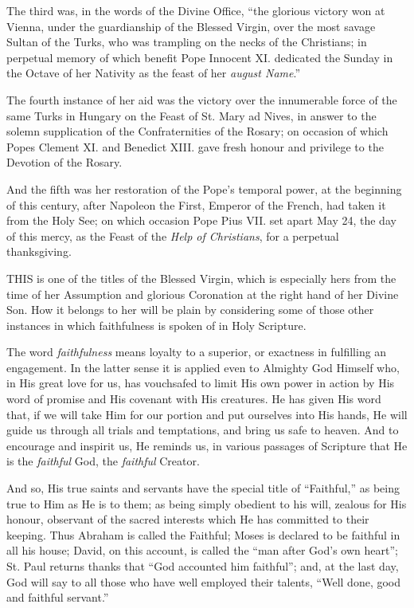 The third was, in the words of
the Divine Office, ``the glorious victory won at Vienna, under the
guardianship of the Blessed Virgin, over the most savage Sultan of the
Turks, who was trampling on the necks of the Christians; in perpetual
memory of which benefit Pope Innocent XI. dedicated the Sunday in the
Octave of her Nativity as the feast of her \emph{august Name}.''

The fourth instance of her aid
was the victory over the innumerable force of the same Turks in Hungary
on the Feast of St. Mary ad Nives, in answer to the solemn supplication
of the Confraternities of the Rosary; on occasion of which Popes Clement
XI. and Benedict XIII. gave fresh honour and privilege to the Devotion
of the Rosary.

And the fifth was her
restoration of the Pope's temporal power, at the beginning of this
century, after Napoleon the First, Emperor of the French, had taken it
from the Holy See; on which occasion Pope Pius VII. set apart May 24,
the day of this mercy, as the Feast of the \emph{Help of Christians},
for a perpetual thanksgiving.



THIS
is one of the titles of the Blessed Virgin, which is especially hers
from the time of her Assumption and glorious Coronation at the right
hand of her Divine Son. How it belongs to her will be plain by
considering some of those other instances in which faithfulness is
spoken of in Holy Scripture.

The word \emph{faithfulness}
means loyalty to a superior, or exactness in fulfilling an engagement.
In the latter sense it is applied even to Almighty God Himself who, in
His great love for us, has vouchsafed to limit His own power in action
by His word of promise and His covenant with His creatures. He has given
His word that, if we will take Him for our portion and put ourselves
into His hands, He will guide us through all trials and temptations, and
bring us safe to heaven. And to encourage and inspirit us, He reminds
us, in various passages of Scripture that He is the \emph{faithful} God,
the \emph{faithful} Creator.

And so, His true saints and
servants have the special title of ``Faithful,'' as being true to Him as
He is to them; as being simply obedient to his will, zealous for His
honour, observant of the sacred interests which He has committed to
their keeping. Thus Abraham is called the Faithful; Moses is declared to
be faithful in all his house; David, on this account, is called the ``man
after God's own heart''; St. Paul returns thanks that ``God accounted him
faithful''; and, at the last day, God will say to all those who have well
employed their talents, ``Well done, good and faithful servant.''

